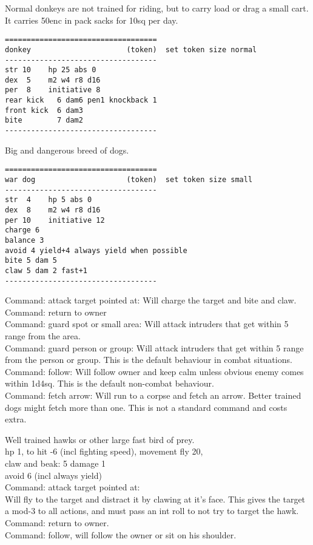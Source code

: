 Normal donkeys are not trained for riding, but to carry load or drag a small cart. It carries 50enc in pack sacks for 10sq per day.
\small \begin{samepage} \begin{verbatim}
===================================
donkey                      (token)  set token size normal
-----------------------------------
str 10    hp 25 abs 0
dex  5    m2 w4 r8 d16
per  8    initiative 8
rear kick   6 dam6 pen1 knockback 1
front kick  6 dam3
bite        7 dam2
-----------------------------------
\end{verbatim} \end{samepage} \normalsize


Big and dangerous breed of dogs.
\small \begin{samepage} \begin{verbatim}
===================================
war dog                     (token)  set token size small
-----------------------------------
str  4    hp 5 abs 0
dex  8    m2 w4 r8 d16
per 10    initiative 12
charge 6
balance 3
avoid 4 yield+4 always yield when possible
bite 5 dam 5
claw 5 dam 2 fast+1
-----------------------------------
\end{verbatim} \end{samepage} \normalsize
Command: attack target pointed at: Will charge the target and bite and claw. \\
Command: return to owner \\
Command: guard spot or small area: Will attack intruders that get within 5 range from the area. \\
Command: guard person or group: Will attack intruders that get within 5 range from the person or group. This is the default behaviour in combat situations. \\
Command: follow: Will follow owner and keep calm unless obvious enemy comes within 1d4sq. This is the default non-combat behaviour. \\
Command: fetch arrow: Will run to a corpse and fetch an arrow. Better trained dogs might fetch more than one. This is not a standard command and costs extra.


Well trained hawks or other large fast bird of prey. \\
hp 1, to hit -6 (incl fighting speed), movement fly 20, \\
claw and beak: 5 damage 1 \\
avoid  6 (incl always yield) \\
Command: attack target pointed at: \\
Will fly to the target and distract it by clawing at it's face. This gives the target a mod-3 to all actions, and must pass an int roll to not try to target the hawk. \\
Command: return to owner. \\
Command: follow, will follow the owner or sit on his shoulder.


